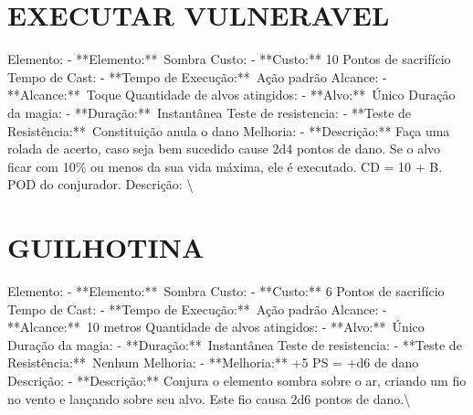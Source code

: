 \documentclass{article}%
\begin{document}
\section{EXECUTAR VULNERAVEL}%
\label{sec:EXECUTARVULNERAVEL}%
Elemento: {-} **Elemento:**~Sombra\newline%
Custo: {-} **Custo:** 10 Pontos de sacrifício\newline%
Tempo de Cast: {-} **Tempo de Execução:**~Ação padrão\newline%
Alcance: {-} **Alcance:**~Toque\newline%
Quantidade de alvos atingidos: {-} **Alvo:**~Único\newline%
Duração da magia: {-} **Duração:**~Instantânea\newline%
Teste de resistencia: {-} **Teste de Resistência:**~Constituição anula o dano\newline%
Melhoria: {-} **Descrição:** Faça uma rolada de acerto, caso seja bem sucedido cause 2d4 pontos de dano. Se o alvo ficar com 10\% ou menos da sua vida máxima, ele é executado. CD = 10 + B. POD do conjurador.\newline%
Descrição: \textbackslash{}

%
\section{GUILHOTINA}%
\label{sec:GUILHOTINA}%
Elemento: {-} **Elemento:**~Sombra\newline%
Custo: {-} **Custo:** 6 Pontos de sacrifício\newline%
Tempo de Cast: {-} **Tempo de Execução:**~Ação padrão\newline%
Alcance: {-} **Alcance:**~10 metros\newline%
Quantidade de alvos atingidos: {-} **Alvo:**~Único\newline%
Duração da magia: {-} **Duração:**~Instantânea\newline%
Teste de resistencia: {-} **Teste de Resistência:**~Nenhum\newline%
Melhoria: {-} **Melhoria:** +5 PS = +d6 de dano\newline%
Descrição: {-} **Descrição:** Conjura o elemento sombra sobre o ar, criando um fio no vento e lançando sobre seu alvo. Este fio causa 2d6 pontos de dano.\textbackslash{}

%
\end{document}
